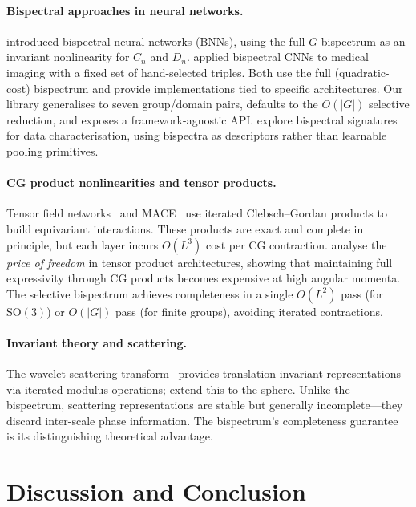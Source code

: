 \documentclass{article}
\newcommand{\SO}{\mathrm{SO}}
\begin{document}
\paragraph{Bispectral approaches in neural networks.}
\citet{sanborn2023bispectral} introduced bispectral neural networks (BNNs),
using the full $G$-bispectrum as an invariant nonlinearity for $C_n$ and $D_n$.
\citet{oreiller2022bispectral} applied bispectral CNNs to medical imaging
with a fixed set of hand-selected triples. Both use the full (quadratic-cost)
bispectrum and provide implementations tied to specific architectures.
Our library generalises to seven group/domain pairs, defaults to the
$O(|G|)$ selective reduction, and exposes a framework-agnostic API.
\citet{chevalley2024bispectral} explore bispectral signatures for data
characterisation, using bispectra as descriptors rather than learnable
pooling primitives.

\paragraph{CG product nonlinearities and tensor products.}
Tensor field networks~\citep{thomas2018tensor} and
MACE~\citep{batatia2024design} use iterated Clebsch--Gordan products
to build equivariant interactions. These products are exact and complete
in principle, but each layer incurs $O(L^3)$ cost per CG contraction.
\citet{price2025freedom} analyse the \emph{price of freedom} in tensor
product architectures, showing that maintaining full expressivity through
CG products becomes expensive at high angular momenta.
The selective bispectrum achieves completeness in a single $O(L^2)$
pass (for $\SO(3)$) or $O(|G|)$ pass (for finite groups), avoiding
iterated contractions.

\paragraph{Invariant theory and scattering.}
The wavelet scattering transform~\citep{mallat2012scattering} provides
translation-invariant representations via iterated modulus operations;
\citet{esteves2018spherical} extend this to the sphere. Unlike the
bispectrum, scattering representations are stable but generally
incomplete---they discard inter-scale phase information.
The bispectrum's completeness guarantee~\citep{kakarala1992triple} is its
distinguishing theoretical advantage.

\section{Discussion and Conclusion}
\label{sec:discussion}
\end{document}
